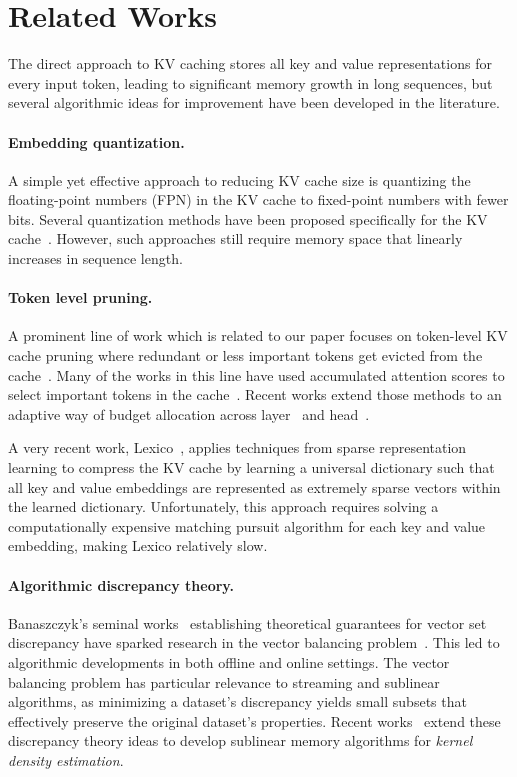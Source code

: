\section{Related Works}
\label{sec:related_works}
The direct approach to KV caching stores all key and value representations for every input token, leading to significant memory growth in long sequences, but several algorithmic ideas for improvement have been developed in the literature.

\paragraph{Embedding quantization.} A simple yet effective approach to reducing KV cache size is quantizing the floating-point numbers (FPN) in the KV cache to fixed-point numbers with fewer bits. 
Several quantization methods have been proposed specifically for the KV cache~\cite{yue2024wkvquant, yang2024no, dong2024qaq, kang2024gear, liu2024kivi, hooper2024kvquant, zhang2024kv, zandieh2024qjl}.
However, such approaches still require memory space that linearly increases in sequence length. 

\paragraph{Token level pruning.} A prominent line of work which is related to our paper focuses on token-level KV cache  pruning where redundant or less important tokens get evicted from the cache~\cite{beltagy2020longformer, zhang2024h2o, liu2024scissorhands, xiao2023efficient, zandieh2024subgen, li2024snapkv}.
Many of the works in this line have used accumulated attention scores to select important tokens in the cache~\cite{zhang2024h2o, li2024snapkv, xiao2023efficient}. 
Recent works extend those methods to an adaptive way of budget allocation across layer~\cite{cai2024pyramidkv} and head~\cite{fu2024not}.


A very recent work, Lexico~\cite{kim2024lexico}, applies techniques from sparse representation learning to compress the KV cache by learning a universal dictionary such that all key and value embeddings are represented as extremely sparse vectors within the learned dictionary. 
Unfortunately, this approach requires solving a computationally expensive matching pursuit algorithm for each key and value embedding, making Lexico relatively slow.

\paragraph{Algorithmic discrepancy theory.}
Banaszczyk's seminal works~\cite{B98, B12} establishing theoretical guarantees for vector set discrepancy have sparked research in the vector balancing problem~\cite{DNTT18}. This led to algorithmic developments in both offline \cite{B10} and online \cite{BJSS19, ALS21, KRR23} settings. The vector balancing problem has particular relevance to streaming and sublinear algorithms, as minimizing a dataset's discrepancy yields small subsets that effectively preserve the original dataset's properties. Recent works~\cite{PT20, CKW24} extend these discrepancy theory ideas to develop sublinear memory algorithms for \emph{kernel density estimation}.